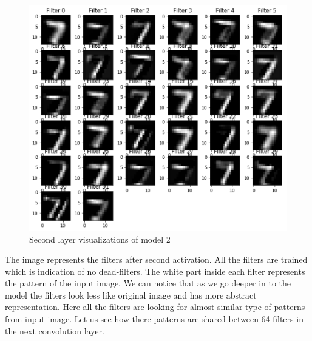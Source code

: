     
\begin{figure}[h]
    \centering
    \includegraphics[width=1.0\textwidth]{thesis_template/images/72vis.png}
    \caption{\small Second layer visualizations of model 2}
    \label{}
    \end{figure}

\newpage \noindent The image represents the filters after second activation. All the filters are trained which is indication of no dead-filters. The white part inside each filter represents the pattern of the input image. We can notice that as we go deeper in to the model the filters look less like original image and has more abstract representation. Here all the filters are looking for almost similar type of patterns from input image. Let us see how there patterns are shared between 64 filters in the next convolution layer.


